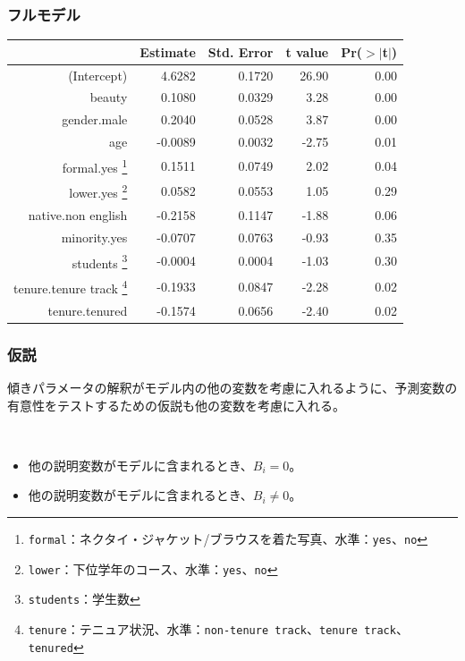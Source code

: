 \begin{frame}[fragile]
\frametitle{フルモデル}

{\small
\begin{center}
\begin{tabular}{rrrrr}
  \hline
 & Estimate & Std. Error & t value & Pr($>$$|$t$|$) \\
  \hline
(Intercept) & 4.6282 & 0.1720 & 26.90 & 0.00 \\
  beauty & 0.1080 & 0.0329 & 3.28 & 0.00 \\
  gender.male & 0.2040 & 0.0528 & 3.87 & 0.00 \\
  age & -0.0089 & 0.0032 & -2.75 & 0.01 \\
formal.yes \footnote{\texttt{formal}：ネクタイ・ジャケット/ブラウスを着た写真、水準：\texttt{yes}、\texttt{no}} & 0.1511 & 0.0749 & 2.02 & 0.04 \\
  lower.yes \footnote{\texttt{lower}：下位学年のコース、水準：\texttt{yes}、\texttt{no}} & 0.0582 & 0.0553 & 1.05 & 0.29 \\
  native.non english & -0.2158 & 0.1147 & -1.88 & 0.06 \\
  minority.yes & -0.0707 & 0.0763 & -0.93 & 0.35 \\
  students \footnote{\texttt{students}：学生数} & -0.0004 & 0.0004 & -1.03 & 0.30 \\
  tenure.tenure track \footnote{\texttt{tenure}：テニュア状況、水準：\texttt{non-tenure track}、\texttt{tenure track}、\texttt{tenured}} & -0.1933 & 0.0847 & -2.28 & 0.02 \\
  tenure.tenured & -0.1574 & 0.0656 & -2.40 & 0.02 \\
   \hline
\end{tabular}
\end{center}
}

\end{frame}


\begin{frame}
\frametitle{仮説}

傾きパラメータの解釈がモデル内の他の変数を考慮に入れるように、予測変数の有意性をテストするための仮説も他の変数を考慮に入れる。

$\:$ \\

\begin{itemize}
\item[]  他の説明変数がモデルに含まれるとき、$B_i = 0$。
\item[]  他の説明変数がモデルに含まれるとき、$B_i \ne 0$。
\end{itemize}

\end{frame}

